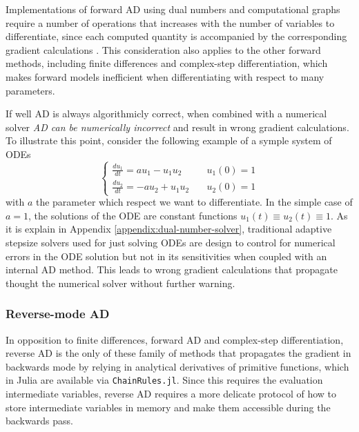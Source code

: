 Implementations of forward AD using dual numbers and computational graphs require a number of operations that increases with the number of variables to differentiate, since each computed quantity is accompanied by the corresponding gradient calculations \cite{Griewank_1989}. 
This consideration also applies to the other forward methods, including finite differences and complex-step differentiation, which makes forward models inefficient when differentiating with respect to many parameters. 

If well AD is always algorithmicly correct, when combined with a numerical solver \textit{AD can be numerically incorrect} and result in wrong gradient calculations. 
To illustrate this point, consider the following example of a symple system of ODEs
\begin{equation}
\begin{cases}
 \frac{du_1}{dt} = a u_1 - u_1 u_2 & \quad u_1(0) = 1  \\ 
 \frac{du_2}{dt} = - a u_2 + u_1 u_2 & \quad u_2(0) = 1
\end{cases}
\end{equation}
with $a$ the parameter which respect we want to differentiate. 
In the simple case of $a=1$, the solutions of the ODE are constant functions $u_1(t) \equiv u_2(t) \equiv 1$. 
As it is explain in Appendix \ref{appendix:dual-number-solver}, traditional adaptive stepsize solvers used for just solving ODEs are design to control for numerical errors in the ODE solution but not in its sensitivities when coupled with an internal AD method. 
This leads to wrong gradient calculations that propagate thought the numerical solver without further warning. 


\subsubsection{Reverse-mode AD}
\label{sec:software-reverse-AD}

In opposition to finite differences, forward AD and complex-step differentiation, reverse AD is the only of these family of methods that propagates the gradient in backwards mode by relying in analytical derivatives of primitive functions, which in Julia are available via \texttt{ChainRules.jl}.
Since this requires the evaluation intermediate variables, reverse AD requires a more delicate protocol of how to store intermediate variables in memory and make them accessible during the backwards pass. 

